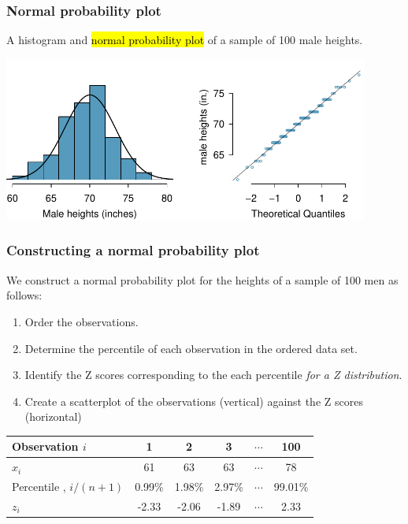 \documentclass[slidestop,compress,mathserif,12pt,t,professionalfonts,xcolor=table]{beamer}
\begin{document}


\begin{frame}
\frametitle{Normal probability plot}

A histogram and \hl{normal probability plot} of a sample of 100 male heights.

\begin{center}
\includegraphics[width=0.9\textwidth]{figures/fcidMHeights/fcidMHeights}
\end{center}


\end{frame}


\begin{frame}
\frametitle{Constructing a normal probability plot}

We construct a normal probability plot for the heights of a sample of 100 men as follows:

\begin{enumerate}

\item Order the observations.

\item Determine the percentile of each observation in the ordered data set.

\item Identify the Z scores corresponding to the each percentile \emph{for a Z distribution}.

\item Create a scatterplot of the observations (vertical) against the Z scores (horizontal)

\end{enumerate}

\pause

\begin{center}
\begin{tabular}{l | c | c | c | c | c}
Observation $i$	& 1		& 2		& 3		& $\cdots$	& 100 \\
\hline
$x_i$			& 61		& 63		& 63		& $\cdots$	& 78 \\
Percentile	, $i / (n+1)$& 0.99\% 	& 1.98\% 	& 2.97\% 	& $\cdots$	& 99.01\% \\
$z_i$			& -2.33	& -2.06 	& -1.89	& $\cdots$	& 2.33
\end{tabular}
\end{center}

\pause


\end{frame}
\end{document}
